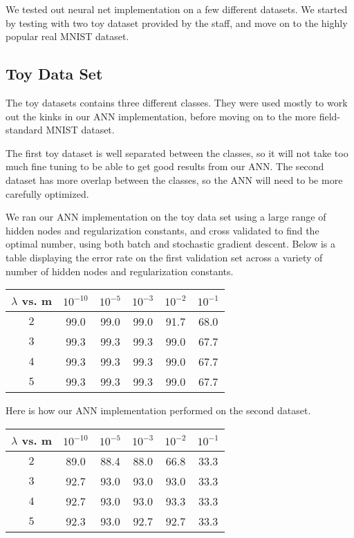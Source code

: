 \documentclass[12pt, twocolumn]{article}
\begin{document}
We tested out neural net implementation on a few different datasets. We started by testing with two toy dataset provided by the staff, and move on to the highly popular real MNIST dataset.

\subsection{ Toy Data Set}

The toy datasets contains three different classes. They were used mostly to work out the kinks in our ANN implementation, before moving on to the more field-standard MNIST dataset.

The first toy dataset is well separated between the classes, so it will not take too much fine tuning to be able to get good results from our ANN. The second dataset has more overlap between the classes, so the ANN will need to be more carefully optimized.

We ran our ANN implementation on the toy data set using a large range of hidden nodes and regularization constants, and cross validated to find the optimal number, using both batch and stochastic gradient descent. Below is a table displaying the error rate on the first validation set across a variety of number of hidden nodes and regularization constants.

\begin{center}
  \begin{tabular}{ | c | c | c | c | c | c | }
    \hline
     $\lambda$ vs. m & $10^{-10}$ & $10^{-5}$ & $10^{-3}$ & $10^{-2}$ & $10^{-1}$ \\ \hline
     $2$ & 99.0 & 99.0 & 99.0 & 91.7 & 68.0 \\ \hline
     $3$ & 99.3 & 99.3 & 99.3 & 99.0 & 67.7 \\ \hline
     $4$ & 99.3 & 99.3 & 99.3 & 99.0 & 67.7 \\ \hline
     $5$ & 99.3 & 99.3 & 99.3 & 99.0 & 67.7 \\
    \hline
  \end{tabular}
\end{center}

Here is how our ANN implementation performed on the second dataset.

\begin{center}
  \begin{tabular}{ | c | c | c | c | c | c | }
    \hline
     $\lambda$ vs. m & $10^{-10}$ & $10^{-5}$ & $10^{-3}$ & $10^{-2}$ & $10^{-1}$ \\ \hline
     $2$ & 89.0 & 88.4 & 88.0 & 66.8 & 33.3 \\ \hline
     $3$ & 92.7 & 93.0 & 93.0 & 93.0 & 33.3 \\ \hline
     $4$ & 92.7 & 93.0 & 93.0 & 93.3 & 33.3 \\ \hline
     $5$ & 92.3 & 93.0 & 92.7 & 92.7 & 33.3 \\
    \hline
  \end{tabular}
\end{center}
\end{document}
